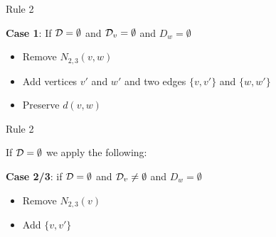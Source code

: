 

        

\begin{frame}[c]{Rule 2}

    \textbf{Case 1}: If $\mathcal{D} = \emptyset$ and $\mathcal{D}_{v} =  \emptyset$ and $D_w = \emptyset$

        \begin{itemize}
            \item Remove $N_{2,3}(v,w)$
            \item Add vertices $v'$ and $w'$ and two edges $\{v, v'\}$ and $\{w, w'\}$
            \item Preserve $d(v,w)$
        \end{itemize}

    \begin{figure}[!ht]
    \end{figure}
\end{frame}

\begin{frame}[c]{Rule 2}

    If $\mathbf{\mathcal{D} = \emptyset}$ we apply the following:

    \textbf{Case 2/3}: if $\mathcal{D} = \emptyset $ and $\mathcal{D}_{v} \neq  \emptyset$ and $D_w = \emptyset$
        \begin{itemize}
            \item Remove $N_{2,3}(v)$
            \item Add $\{v, v'\}$
        \end{itemize}
    \begin{figure}[!ht]
    \end{figure}
\end{frame}

